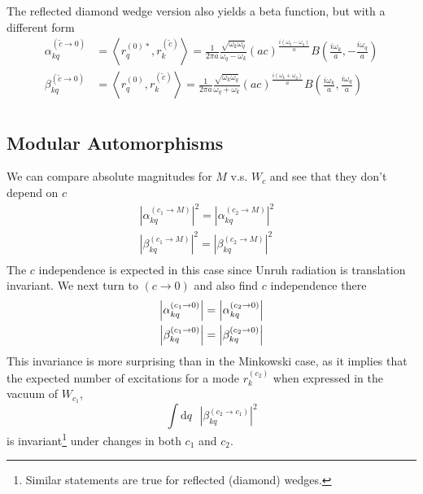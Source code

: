 \documentclass[12pt,a4paper]{article}
\newcommand{\dv}[1]{\mathrm{d} #1 \text{ }}
\begin{document}
The reflected diamond wedge version also yields a beta function, but with a different form
\begin{equation}
  \begin{aligned}
    \alpha^{(\widetilde{c} \rightarrow 0)}_{kq}     &= \left<r_q^{(0)*}, r_k^{(\widetilde{c})} \right> = \frac{1}{2 \pi a}\frac{\sqrt{\omega_k \omega_q}}{\omega_q - \omega_k} (ac)^{\frac{i(\omega_k - \omega_q)}{a}} B\left(\frac{i\omega_k}{a}, -\frac{i\omega_q}{a}\right) \\
    \beta^{(\widetilde{c} \rightarrow 0)}_{kq} &= \left<r_q^{(0)}, r_k^{(\widetilde{c})} \right> = \frac{1}{2 \pi a}\frac{\sqrt{\omega_k \omega_q}}{\omega_q + \omega_k} (ac)^{\frac{i(\omega_k + \omega_q)}{a}} B\left(\frac{i\omega_k}{a}, \frac{i\omega_q}{a}\right) \\
  \end{aligned}
  \label{bogoTC0}
\end{equation}

\subsection{Modular Automorphisms} \label{sec:mod}

We can compare absolute magnitudes for $M$ v.s. $W_c$ and see that they don't depend on $c$
\begin{equation}
  \begin{array}{cc}
    \left|\alpha_{kq}^{(c_1 \rightarrow M)}\right|^2 = \left|\alpha_{kq}^{(c_2 \rightarrow M)}\right|^2 & \\
    \left|\beta_{kq}^{(c_1 \rightarrow M)}\right|^2 = \left|\beta_{kq}^{(c_2 \rightarrow M)}\right|^2 & \\
 \end{array}
\end{equation}
The $c$ independence is expected in this case since Unruh radiation is translation invariant. We next turn to $(c \rightarrow 0)$ and also find $c$ independence there 
\begin{equation}
  \begin{array}{c}
    \left|\alpha_{kq}^{(c_1 \rightarrow 0)}\right| = \left|\alpha_{kq}^{(c_2 \rightarrow 0)}\right| \vspace{4pt} \\
    \left|\beta_{kq}^{(c_1 \rightarrow 0)}\right| = \left|\beta_{kq}^{(c_2 \rightarrow 0)}\right| \\
  \end{array}
\end{equation}
This invariance is more surprising than in the Minkowski case, as it implies that the expected number of excitations for a mode $r_k^{(c_2)}$ when expressed in the vacuum of $W_{c_1}$,
\begin{equation}
  \int \dv{q} |\beta^{(c_2 \rightarrow c_1)}_{kq}|^2
\end{equation}
is invariant\footnote{Similar statements are true for reflected (diamond) wedges.} under changes in both $c_1$ and $c_2$.
\end{document}
